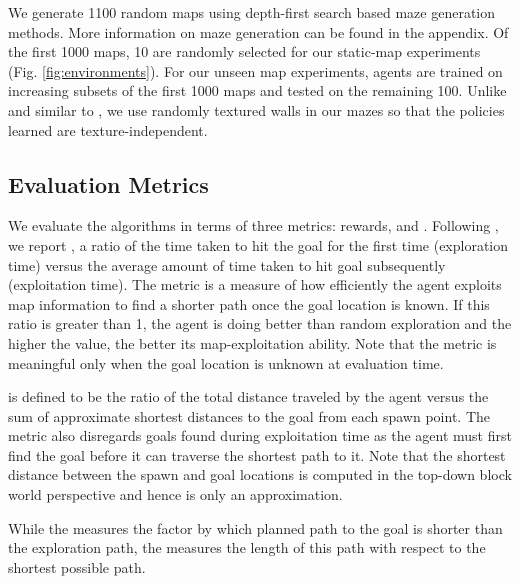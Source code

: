 We generate 1100 random maps using depth-first search based maze generation methods.
More information on maze generation can be found in the appendix. 
Of the first 1000 maps, 10 are randomly selected for our static-map experiments (Fig. \ref{fig:environments}). For our unseen map experiments, agents are trained on increasing subsets of the first 1000 maps and tested on the remaining 100.
Unlike \cite{MiPaViICLR2017} and similar to \cite{ChLaSaNIPS2016}, we use randomly textured walls in our mazes so that the policies learned are texture-independent.





\subsection{Evaluation Metrics}

We evaluate the algorithms in terms of three metrics: rewards, \emph{\LatencyOneGtOne{}} and \emph{\DistanceInefficiency{}}.
Following \cite{MiPaViICLR2017}, we report \emph{\LatencyOneGtOne{}}, a ratio of the time taken to hit the goal for the first time (exploration time) versus the average amount of time taken to hit goal subsequently (exploitation time).
The metric is a measure of how efficiently the agent exploits map information to find a shorter path once the goal location is known. 
If this ratio is greater than 1, the agent is doing better than random exploration and the higher the value, the better its map-exploitation ability.
Note that the metric is meaningful only when the goal location is unknown at evaluation time.


\emph{\DistanceInefficiency{}} is defined to be the ratio of the total distance traveled by the agent versus the sum of approximate shortest distances to the goal from each spawn point. The metric also disregards goals found during exploitation time as the agent must first find the goal before it can traverse the shortest path to it.
Note that the shortest distance between the spawn and goal locations is computed in the top-down block world perspective and hence is only an approximation.

While the \LatencyOneGtOne{} measures the factor by which planned path to the goal is shorter than the exploration path, the \DistanceInefficiency{} measures the length of this path with respect to the shortest possible path. 
